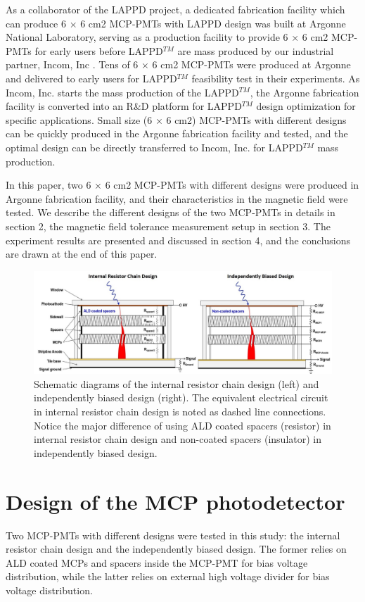 \documentclass[preprint,5p]{elsarticle}
\begin{document}
As a collaborator of the LAPPD project, a dedicated fabrication facility 
\cite{15} which can produce 6 × 6 cm2 MCP-PMTs with LAPPD design was built at 
Argonne National Laboratory, serving as a production facility to provide 6 × 6 
cm2 MCP-PMTs for early users before LAPPD$^{TM}$ are mass produced by our industrial 
partner, Incom, Inc \cite{16}. Tens of 6 × 6 cm2 MCP-PMTs were produced at 
Argonne and delivered to early users for LAPPD$^{TM}$ feasibility test in their 
experiments. As Incom, Inc.  starts the mass production of the LAPPD$^{TM}$, the 
Argonne fabrication facility is converted into an R\&D platform for LAPPD$^{TM}$ 
design optimization for specific applications. Small size (6 × 6 cm2) MCP-PMTs 
with different designs can be quickly produced in the Argonne fabrication 
facility and tested, and the optimal design can be directly transferred to 
Incom, Inc. for LAPPD$^{TM}$ mass production. 

In this paper, two 6 × 6 cm2 MCP-PMTs with different designs were produced in 
Argonne fabrication facility, and their characteristics in the magnetic field 
were tested. We describe the different designs of the two MCP-PMTs in details 
in section 2, the magnetic field tolerance measurement setup in section 3. The 
experiment results are presented and discussed in section 4, and the 
conclusions are drawn at the end of this paper.



\begin{figure}[tbp]
\centering \includegraphics[scale=1.1]{fig/qqXSwD.jpg}
\caption{Schematic diagrams of the internal resistor chain design (left) and 
   independently biased design (right). The equivalent electrical circuit in 
   internal resistor chain design is noted as dashed line connections. Notice 
   the major difference of using ALD coated spacers (resistor) in internal 
   resistor chain design and non-coated spacers (insulator) in independently 
   biased design.} \label{fig:design}
\end{figure}

\section{Design of the MCP photodetector} \label{sec_design}
Two MCP-PMTs with different designs were tested in this study: the internal 
resistor chain design and the independently biased design. The former relies on 
ALD coated MCPs and spacers inside the MCP-PMT for bias voltage distribution, 
while the latter relies on external high voltage divider for bias voltage 
distribution.  
\end{document}
